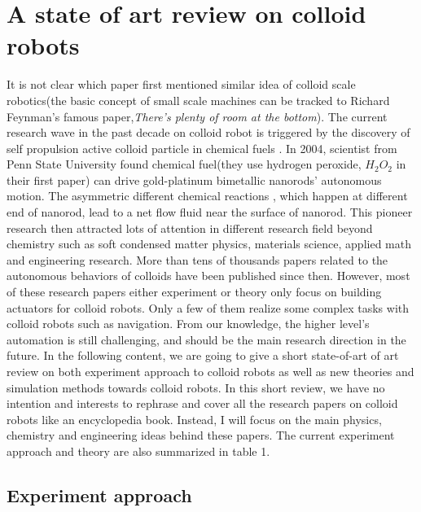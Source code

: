 \section{A state of art review on colloid robots }
It is not clear which paper first mentioned  similar idea of colloid scale robotics(the basic concept of  small scale machines can be tracked to Richard Feynman's famous paper,\textit{There's plenty of room at the bottom}\cite{feynman1960there}). The current research wave in the past decade on colloid robot is triggered by the discovery of self propulsion active colloid particle in chemical fuels \cite{paxton2004catalytic}. In 2004, scientist from Penn State University found chemical fuel(they use hydrogen peroxide, $H_2O_2$ in their first paper) can drive  gold-platinum bimetallic nanorods' autonomous motion. The asymmetric different chemical reactions , which happen at different end of nanorod,  lead to a net flow fluid near the surface of nanorod. This pioneer research then attracted lots of attention in different research field beyond chemistry such as soft condensed matter physics\cite{Marchetti2013}, materials science\cite{han2018engineering}, applied math\cite{fodor2016far} and engineering research\cite{sitti2015biomedical}. More than tens of thousands papers related to the autonomous behaviors of colloids have been published since then. However, most of these research papers either experiment or theory only focus on building actuators for colloid robots. Only a few of them realize some complex tasks with colloid robots such as navigation. From our knowledge, the higher level's automation is still challenging, and should be the main research direction in the future. In the following content, we are going to give a short state-of-art of art review on both experiment approach to colloid robots as well as new theories and simulation methods towards colloid robots. In this short review, we have no intention and interests to rephrase and cover all the research papers on colloid robots like an encyclopedia book. Instead,  I will focus on the main physics, chemistry and engineering ideas behind these papers. The current experiment approach and theory are also summarized in table 1.

\subsection{Experiment approach}

